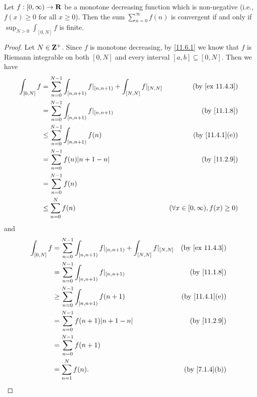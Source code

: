 \begin{proposition}\label{11.6.4}
  Let \(f : [0, \infty) \to \mathbf{R}\) be a monotone decreasing function which is non-negative
  (i.e., \(f(x) \geq 0\) for all \(x \geq 0\)).
  Then the sum \(\sum_{n = 0}^\infty f(n)\) is convergent if and only if \(\sup_{N > 0} \int_{[0, N]} f\) is finite.
\end{proposition}

\begin{proof}
  Let \(N \in \mathbf{Z}^+\).
  Since \(f\) is monotone decreasing, by \cref{11.6.1} we know that \(f\) is Riemann integrable on both \([0, N]\) and every interval \([a, b] \subseteq [0, N]\).
  Then we have
  \begin{align*}
    \int_{[0, N]} f & = \sum_{n = 0}^{N - 1} \int_{[n, n + 1)} f|_{[n, n + 1)} + \int_{[N, N]} f|_{[N, N]} & \text{(by \cref{ex 11.4.3})}             \\
                    & = \sum_{n = 0}^{N - 1} \int_{[n, n + 1)} f|_{[n, n + 1)}                             & \text{(by \cref{11.1.8})}                \\
                    & \leq \sum_{n = 0}^{N - 1} \int_{[n, n + 1)} f(n)                                     & \text{(by \cref{11.4.1}(e))}             \\
                    & = \sum_{n = 0}^{N - 1} f(n) \abs{n + 1 - n}                                          & \text{(by \cref{11.2.9})}                \\
                    & = \sum_{n = 0}^{N - 1} f(n)                                                                                                     \\
                    & \leq \sum_{n = 0}^N f(n)                                                             & (\forall x \in [0, \infty), f(x) \geq 0)
  \end{align*}
  and
  \begin{align*}
    \int_{[0, N]} f & = \sum_{n = 0}^{N - 1} \int_{[n, n + 1)} f|_{[n, n + 1)} + \int_{[N, N]} f|_{[N, N]} & \text{(by \cref{ex 11.4.3})} \\
                    & = \sum_{n = 0}^{N - 1} \int_{[n, n + 1)} f|_{[n, n + 1)}                             & \text{(by \cref{11.1.8})}    \\
                    & \geq \sum_{n = 0}^{N - 1} \int_{[n, n + 1)} f(n + 1)                                 & \text{(by \cref{11.4.1}(e))} \\
                    & = \sum_{n = 0}^{N - 1} f(n + 1) \abs{n + 1 - n}                                      & \text{(by \cref{11.2.9})}    \\
                    & = \sum_{n = 0}^{N - 1} f(n + 1)                                                                                     \\
                    & = \sum_{n = 1}^N f(n).                                                               & \text{(by \cref{7.1.4}(b))}
  \end{align*}


\end{proof}
